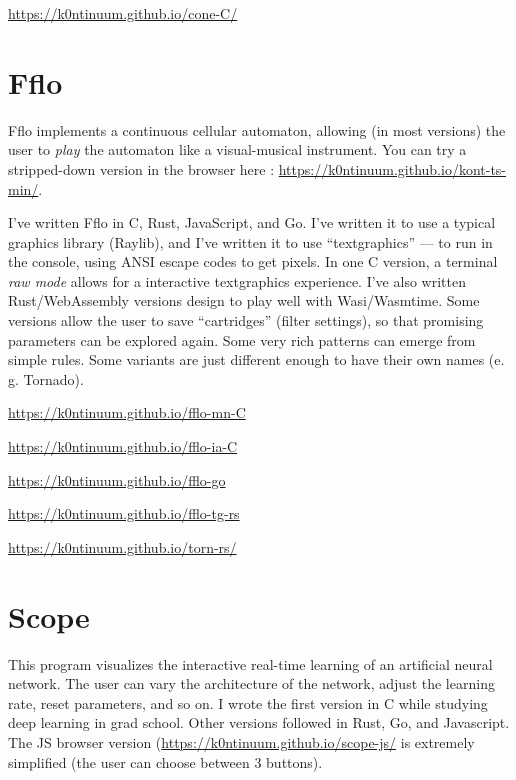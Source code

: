\documentclass{article}
\renewcommand{\i}{\textit}
\newcommand{\q}{\enquote}
\begin{document}
{{\url{https://k0ntinuum.github.io/cone-C/}

\section*{Fflo}

Fflo implements a continuous cellular automaton, allowing (in most versions) the user to \i{play} the automaton like a visual-musical instrument. You can try a stripped-down version in the browser here : \url{https://k0ntinuum.github.io/kont-ts-min/}.  

I've written Fflo  in C, Rust, JavaScript, and Go. I've written it to use a typical graphics library (Raylib), and I've written it to use \q{textgraphics} --- to run in the console, using ANSI escape codes to get pixels. In one C version, a terminal \i{raw mode} allows for a interactive textgraphics experience. I've also written Rust/WebAssembly versions design to play well with Wasi/Wasmtime. Some versions allow the user to save \q{cartridges} (filter settings), so that promising parameters can be explored again. Some very rich patterns can emerge from simple rules. Some variants are just different enough to have their own names (e. g. Tornado).

\url{https://k0ntinuum.github.io/fflo-mn-C}

\url{https://k0ntinuum.github.io/fflo-ia-C}

\url{https://k0ntinuum.github.io/fflo-go}

\url{https://k0ntinuum.github.io/fflo-tg-rs}

\url{https://k0ntinuum.github.io/torn-rs/}

\section*{Scope}

This program visualizes the interactive real-time learning of an artificial neural network. The user can vary the architecture of the network, adjust the learning rate, reset parameters, and so on.  I wrote the first version in C while studying deep learning in grad school. Other versions followed in Rust, Go, and Javascript. The JS browser version (\url{https://k0ntinuum.github.io/scope-js/} is extremely simplified (the user can choose between $3$ buttons). 


}}
\end{document}
